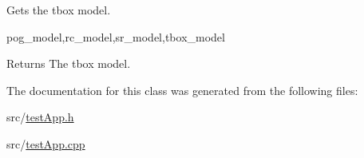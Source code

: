 Gets the tbox model. 

pog\-\_\-model,rc\-\_\-model,sr\-\_\-model,tbox\-\_\-model

\begin{DoxyReturn}{Returns}
The tbox model. 
\end{DoxyReturn}


The documentation for this class was generated from the following files\-:\begin{DoxyCompactItemize}
\item 
src/\hyperlink{test_app_8h}{test\-App.\-h}\item 
src/\hyperlink{test_app_8cpp}{test\-App.\-cpp}\end{DoxyCompactItemize}
